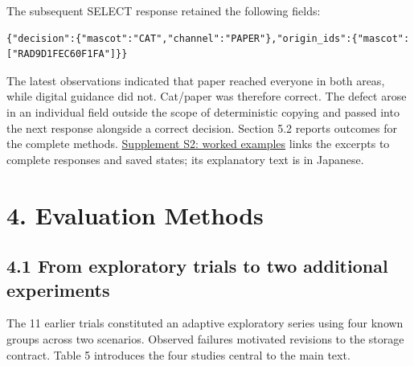 \documentclass[10pt,a4paper]{article}
\begin{document}
The subsequent SELECT response retained the following fields:

\noindent\begin{minipage}{\linewidth}
\begin{verbatim}
{"decision":{"mascot":"CAT","channel":"PAPER"},"origin_ids":{"mascot":["RAD9D1FEC60F1FA"]}}
\end{verbatim}
\end{minipage}\par

The latest observations indicated that paper reached everyone in both areas, while digital guidance did not. Cat/paper was therefore correct. The defect arose in an individual field outside the scope of deterministic copying and passed into the next response alongside a correct decision. Section 5.2 reports outcomes for the complete methods. \href{https://github.com/metaSATOKEN/MRSI/blob/9443de315d283874df0c27e0e99b8c04f400709d/papers/paper-01/examples-v0.1-2026-09-23.md}{Supplement S2: worked examples} links the excerpts to complete responses and saved states; its explanatory text is in Japanese.

\section{4. Evaluation Methods}\label{paper-01-evaluation-methods}

\subsection{4.1 From exploratory trials to two additional experiments}\label{paper-01-from-exploratory-trials-to-two-additional-experiments}

The 11 earlier trials constituted an adaptive exploratory series using four known groups across two scenarios. Observed failures motivated revisions to the storage contract. Table 5 introduces the four studies central to the main text.
\end{document}
